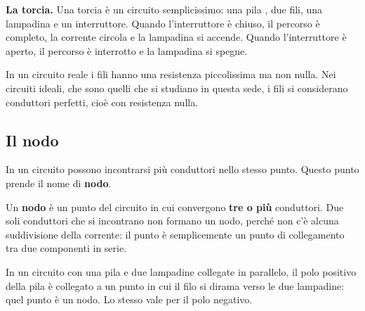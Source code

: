 \begin{esempio}
\textbf{La torcia.} Una torcia è un circuito semplicissimo: una pila , due fili, una lampadina e un interruttore. Quando l'interruttore è chiuso, il percorso è completo, la corrente circola e la lampadina si accende. Quando l'interruttore è aperto, il percorso è interrotto e la lampadina si spegne.
\end{esempio}

\begin{attenzione}
In un circuito reale i fili hanno una resistenza piccolissima ma non nulla. Nei circuiti ideali, che sono quelli che si studiano in questa sede, i fili si considerano conduttori perfetti, cioè con resistenza nulla.
\end{attenzione}

\subsection{Il nodo}

In un circuito possono incontrarsi più conduttori nello stesso punto. Questo punto prende il nome di \textbf{nodo}.

\begin{concetto}
Un \textbf{nodo} è un punto del circuito in cui convergono \textbf{tre o più} conduttori. Due soli conduttori che si incontrano non formano un nodo, perché non c'è alcuna suddivisione della corrente: il punto è semplicemente un punto di collegamento tra due componenti in serie.
\end{concetto}

\begin{figure}[htbp]
\centering
{}
\end{figure}

\begin{esempio}
In un circuito con una pila e due lampadine collegate in parallelo, il polo positivo della pila è collegato a un punto in cui il filo si dirama verso le due lampadine: quel punto è un nodo. Lo stesso vale per il polo negativo.
\end{esempio}

